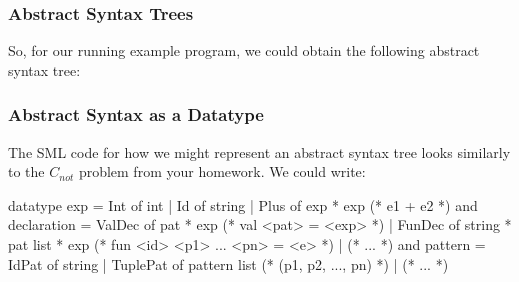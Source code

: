 \documentclass[aspectratio=169, handout]{beamer}
\begin{document}
\begin{frame}[fragile]
  \frametitle{Abstract Syntax Trees}

  So, for our running example program, we could obtain
  the following abstract syntax tree:
  \pause
  \begin{center}
  \end{center}
\end{frame}

\begin{frame}[fragile]
  \frametitle{Abstract Syntax as a Datatype}

  \tgs

  The SML code for how we might represent an abstract syntax tree looks
  similarly to the $C_{not}$ problem from your homework. We could write:

  \pause
  \small
  \begin{codeblock}
    datatype exp =
        Int of int
      | Id of string
      | Plus of exp * exp               (* e1 + e2 *)
    and declaration =
        ValDec of pat * exp             (* val <pat> = <exp> *)
      | FunDec of string * pat list * exp
          (* fun <id> <p1> ... <pn> = <e> *)
      | (* ... *)
    and pattern =
        IdPat of string
      | TuplePat of pattern list        (* (p1, p2, ..., pn) *)
      | (* ... *)
  \end{codeblock}
\end{frame}
\end{document}
